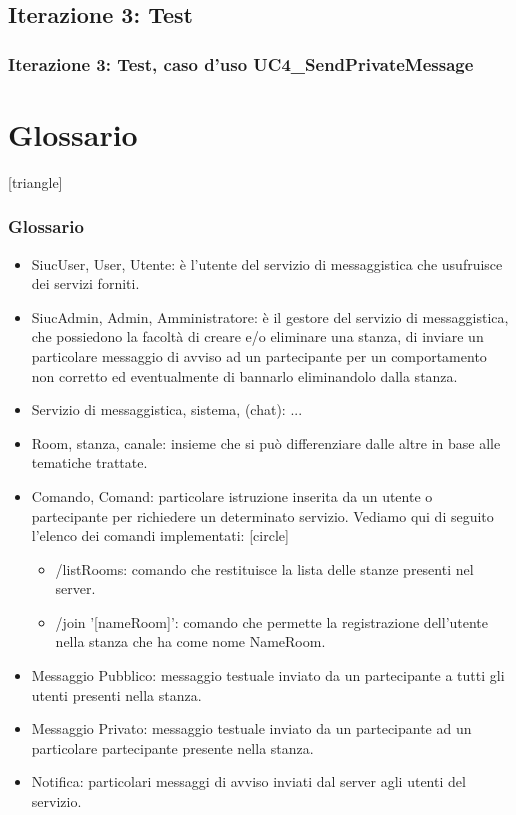 \documentclass[t]{beamer} %
\let\olditem=\item%
\renewcommand{\item}{\olditem \justifying}%
\begin{document}
\subsection{Iterazione 3: Test}
\begin{frame}
  \frametitle{Iterazione 3: Test, caso d'uso UC4\_SendPrivateMessage}
\end{frame}

\section{Glossario}
[triangle]
\begin{frame} [allowframebreaks]
  \frametitle{Glossario} 
   \begin{itemize} 
    \item SiucUser, User, Utente: è l'utente del servizio di messaggistica che usufruisce dei servizi forniti.
    \item SiucAdmin, Admin, Amministratore: è il gestore del servizio di messaggistica, che possiedono la facoltà di creare e/o eliminare una stanza, di inviare un 
          particolare messaggio di avviso ad un partecipante per un comportamento non corretto ed eventualmente di bannarlo eliminandolo dalla stanza.
    \item Servizio di messaggistica, sistema, (chat): ...
    \item Room, stanza, canale: insieme che si può differenziare dalle altre in base alle tematiche trattate.
    \item Comando, Comand: particolare istruzione inserita da un utente o partecipante per richiedere un determinato servizio. Vediamo qui di seguito l’elenco dei 
          comandi implementati:
     [circle]
     \begin{itemize} 
      \item /listRooms:	comando che restituisce la lista delle stanze presenti nel server.
      \item /join '[nameRoom]': comando che permette la registrazione dell’utente nella stanza che ha come nome NameRoom.
     \end{itemize}   
    \item Messaggio Pubblico: messaggio testuale inviato da un partecipante a tutti gli utenti presenti nella stanza.
    \item Messaggio Privato: messaggio testuale inviato da un partecipante ad un particolare partecipante presente nella stanza.
    \item Notifica: particolari messaggi di avviso inviati dal server agli utenti del servizio.  
  \end{itemize}
\end{frame}
\end{document}
